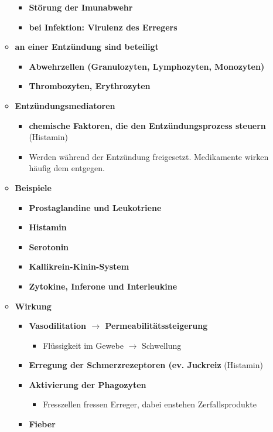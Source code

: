 \begin{itemize}
\begin{itemize}
\begin{itemize}
				\item \textbf{Störung der Imunabwehr}
				\item \textbf{bei Infektion: Virulenz des Erregers}
			\end{itemize}
		\item \textbf{an einer Entzündung sind beteiligt}
			\begin{itemize}
				\item \textbf{Abwehrzellen (Granulozyten, Lymphozyten, Monozyten)}
				\item \textbf{Thrombozyten, Erythrozyten}
			\end{itemize}
		\item \textbf{Entzündungsmediatoren}
			\begin{itemize}
				\item \textbf{chemische Faktoren, die den Entzündungsprozess steuern} (Histamin)
				\item Werden während der Entzündung freigesetzt. Medikamente wirken häufig dem entgegen.
			\end{itemize}
		\item \textbf{Beispiele}
			\begin{itemize}
				\item \textbf{Prostaglandine und Leukotriene}
				\item \textbf{Histamin}
				\item \textbf{Serotonin}
				\item \textbf{Kallikrein-Kinin-System}
				\item \textbf{Zytokine, Inferone und Interleukine}
			\end{itemize}
		\item \textbf{Wirkung}
			\begin{itemize}
				\item \textbf{Vasodilitation $\rightarrow$ Permeabilitätssteigerung}
					\begin{itemize}
						\item Flüssigkeit im Gewebe $\rightarrow$ Schwellung
					\end{itemize}
				\item \textbf{Erregung der Schmerzrezeptoren (ev. Juckreiz} (Histamin)
				\item \textbf{Aktivierung der Phagozyten}
					\begin{itemize}
						\item Fresszellen fressen Erreger, dabei enstehen Zerfallsprodukte
					\end{itemize}
				\item \textbf{Fieber}

\end{itemize}
\end{itemize}
\end{itemize}
